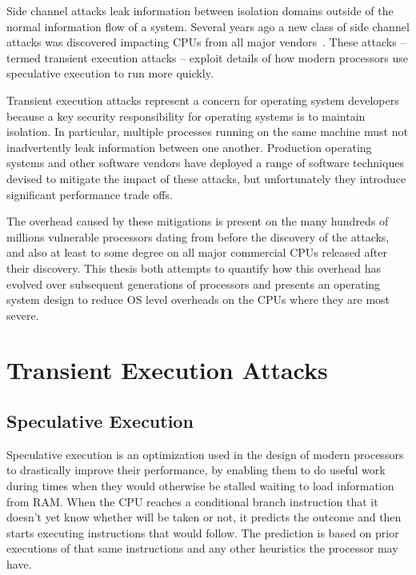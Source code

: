 \noindent
Side channel attacks leak information between isolation domains outside of the normal information flow of a system.
Several years ago a new class of side channel attacks was discovered impacting CPUs from all major vendors~\cite{lipp:meltdown, kocher:spectre}.
These attacks -- termed transient execution attacks -- exploit details of how modern processors use speculative execution to run more quickly. 

Transient execution attacks represent a concern for operating system developers because a key security responsibility for operating systems is to maintain isolation.
In particular, multiple processes running on the same machine must not inadvertently leak information between one another.
Production operating systems and other software vendors have deployed a range of software techniques devised to mitigate the impact of these attacks, but unfortunately they introduce significant performance trade offs.

The overhead caused by these mitigations is present on the many hundreds of millions vulnerable processors dating from before the discovery of the attacks, and also at least to some degree on all major commercial CPUs released after their discovery.
This thesis both attempts to quantify how this overhead has evolved over subsequent generations of processors and presents an operating system design to reduce OS level overheads on the CPUs where they are most severe.  



\section{Transient Execution Attacks}
\subsection{Speculative Execution}
Speculative execution is an optimization used in the design of modern processors to drastically improve their performance, by enabling them to do useful work during times when they would otherwise be stalled waiting to load information from RAM.
When the CPU reaches a conditional branch instruction that it doesn't yet know whether will be taken or not, it predicts the outcome and then starts executing instructions that would follow.
The prediction is based on prior executions of that same instructions and any other heuristics the processor may have.

